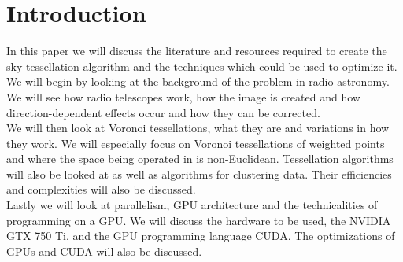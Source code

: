 \section{Introduction}\label{int}
In this paper we will discuss the literature and resources required to create the sky tessellation algorithm and the techniques which could be used to optimize it.
\\
We will begin by looking at the background of the problem in radio astronomy. We will see how radio telescopes work, how the image is created and how direction-dependent effects occur and how they can be corrected.
\\
We will then look at Voronoi tessellations, what they are and variations in how they work. We will especially focus on Voronoi tessellations of weighted points and where the space being operated in is non-Euclidean. Tessellation algorithms will also be looked at as well as algorithms for clustering data. Their efficiencies and complexities will also be discussed.
\\
Lastly we will look at parallelism, GPU architecture and the technicalities of programming on a GPU. We will discuss the hardware to be used, the NVIDIA GTX 750 Ti, and the GPU programming language CUDA. The optimizations of GPUs and CUDA will also be discussed.
